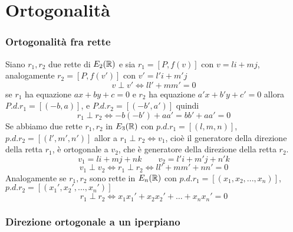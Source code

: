 \documentclass[twoside]{report}
\begin{document}
\section{Ortogonalità}
\subsubsection{Ortogonalità fra rette}
Siano \(r_1, r_2\) due rette di \(E_2(\RR)\) e sia \(r_1 = [P, f(v)]\) con \(v = li + mj\), analogamente \(r_2 = [P, f(v')]\) con \( v' = l'i + m'j\) \[
    v \perp v' \iff ll' + mm' = 0
    \] se \(r_1\) ha equazione \(ax + by + c = 0\) e \(r_2\) ha equazione \(a'x + b'y + c' = 0\) allora \(P.d.r_1 = [(-b,a)]\), e \(P.d.r_2 = [(-b', a')]\) quindi \[
    r_1 \perp r_2 \iff -b (-b') + aa' = bb' + aa' = 0
\]
Se abbiamo due rette \(r_1, r_2\) in \(E_3(\RR)\) con \(p.d.r_1 = [(l,m,n)]\), \(p.d.r_2 = [(l',m',n')]\) allor a \(r_1 \perp r_2 \iff v_1\), cioè il generatore della direzione della retta \(r_1\), è ortogonale a \(v_2\), che è generatore della direzione della retta \(r_2\). \[
    v_1 = li + mj + nk \qquad v_2 = l'i + m'j + n'k
\] \[
    v_1 \perp v_2 \iff r_1 \perp r_2 \iff ll' + mm' + nn' = 0
\] Analogamente se \(r_1, r_2\) sono rette in \(E_n(\RR)\) con \(p.d.r_1 = [(x_1, x_2, ..., x_n)]\), \(p.d.r_2 = [(x_1', x_2', ..., x_n')]\) \[
r_1 \perp r_2 \iff x_1x_1' + x_2 x_2' + \ldots  + x_n x_n' = 0
\] 

\subsubsection{Direzione ortogonale a un iperpiano}
\end{document}
